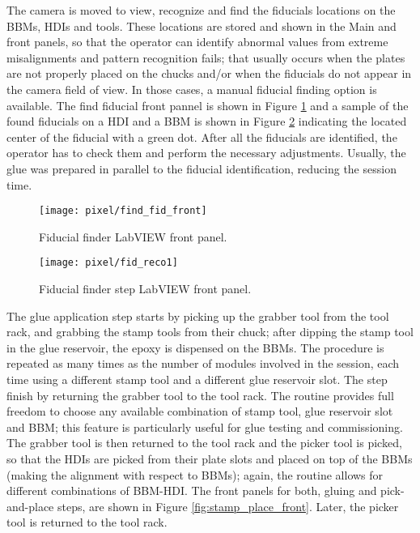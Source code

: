The camera is moved to view, recognize and find the fiducials locations on the BBMs, HDIs and tools. These locations are stored and shown in the Main and  front panels, so that the operator can identify abnormal values from extreme misalignments and pattern recognition fails; that usually occurs when the plates are not properly placed on the chucks and/or when the fiducials do not appear in the camera field of view. In those cases, a manual fiducial finding option is available. The find fiducial front pannel is shown in Figure \ref{fig:find_fid_front} and a sample of the found fiducials on a HDI and a BBM is shown in Figure \ref{fig:fid_reco} indicating the located center of the fiducial with a green dot. After all the fiducials are identified, the operator has to check them and perform the necessary adjustments. Usually, the glue was prepared in parallel to the fiducial identification, reducing the session time.  

\begin{landscape}
\begin{figure}[h]
\begin{center}
    \vspace{-2.9cm}
    \hspace{-1cm}
    \texttt{[image: pixel/find\_fid\_front]}
    \caption[Fiducial finder LabVIEW front panel]{Fiducial finder LabVIEW front panel.}\label{fig:find_fid_front}
    \vspace{-2cm}
    \hspace{-2cm}
\end{center}
\end{figure}
\end{landscape}


\begin{figure}[h]
\begin{center}
  \texttt{[image: pixel/fid\_reco1]}
 \caption[Fiducial finder step LabVIEW front panel]{Fiducial finder step LabVIEW front panel.}\label{fig:fid_reco}
\end{center}
\end{figure}

The glue application step starts by picking up the grabber tool from the tool rack, and grabbing the stamp tools from their chuck; after dipping the stamp tool in the glue reservoir, the epoxy is dispensed on the BBMs. The procedure is repeated as many times as the number of modules involved in the session, each time using a different stamp tool and a different glue reservoir slot. The step finish by returning the grabber tool to the tool rack. The routine provides full freedom to choose any available combination of stamp tool, glue reservoir slot and BBM; this feature is particularly useful for glue testing and commissioning. The grabber tool is then returned to the tool rack and the picker tool is picked, so that the HDIs are picked from their plate slots and placed on top of the BBMs (making the alignment with respect to BBMs); again, the routine allows for different combinations of BBM-HDI. The front panels for both, gluing and pick-and-place steps, are shown in Figure \ref{fig:stamp_place_front}. Later, the picker tool is returned to the tool rack.

